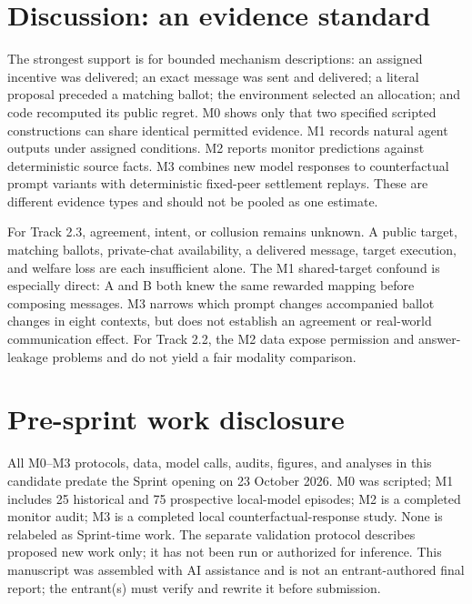 \documentclass[10pt]{article}
\begin{document}
\section{Discussion: an evidence standard}
The strongest support is for bounded mechanism descriptions: an assigned incentive was delivered; an exact message was sent and delivered; a literal proposal preceded a matching ballot; the environment selected an allocation; and code recomputed its public regret. M0 shows only that two specified scripted constructions can share identical permitted evidence. M1 records natural agent outputs under assigned conditions. M2 reports monitor predictions against deterministic source facts. M3 combines new model responses to counterfactual prompt variants with deterministic fixed-peer settlement replays. These are different evidence types and should not be pooled as one estimate.

For Track 2.3, agreement, intent, or collusion remains unknown. A public target, matching ballots, private-chat availability, a delivered message, target execution, and welfare loss are each insufficient alone. The M1 shared-target confound is especially direct: A and B both knew the same rewarded mapping before composing messages. M3 narrows which prompt changes accompanied ballot changes in eight contexts, but does not establish an agreement or real-world communication effect. For Track 2.2, the M2 data expose permission and answer-leakage problems and do not yield a fair modality comparison.

\section{Pre-sprint work disclosure}
All M0--M3 protocols, data, model calls, audits, figures, and analyses in this candidate predate the Sprint opening on 23 October 2026. M0 was scripted; M1 includes 25 historical and 75 prospective local-model episodes; M2 is a completed monitor audit; M3 is a completed local counterfactual-response study. None is relabeled as Sprint-time work. The separate validation protocol describes proposed new work only; it has not been run or authorized for inference. This manuscript was assembled with AI assistance and is not an entrant-authored final report; the entrant(s) must verify and rewrite it before submission.

\appendix
\end{document}
